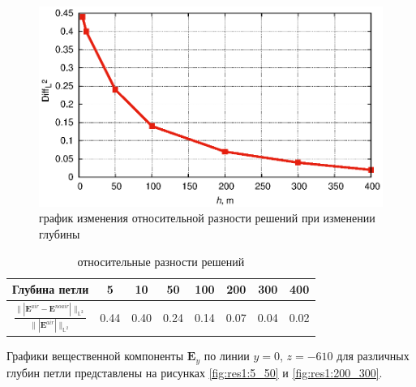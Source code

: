 \documentclass[a4paper,12pt]{article}
\begin{document}
\begin{figure}[H]
	\centering
	\includegraphics[scale=1]{research-1/presentation/presentation.eps}
	\caption{график изменения относительной разности решений при изменении глубины}
	\label{fig:res1:graph}
\end{figure}

\begin{table}[H]
	\caption{относительные разности решений}
	\label{tab:res1:diff}
	\begin{tabularx}{\textwidth}{|C{2.4}|C{0.8}|C{0.8}|C{0.8}|C{0.8}|C{0.8}|C{0.8}|C{0.8}|}
		\hline Глубина петли & 5 & 10 & 50 & 100 & 200 & 300 & 400 \\
		\hline $\displaystyle \frac{\| | \mathbf{E}^{air} - \mathbf{E}^{noair} | \|_{\mathbb{L}^2}}{\| | \mathbf{E}^{air} | \|_{\mathbb{L}^2}}$ & 0.44 & 0.40 & 0.24 & 0.14 & 0.07 & 0.04 & 0.02 \\
		\hline
	\end{tabularx}
\end{table}

Графики вещественной компоненты $\mathbf{E}_y$ по линии $y=0$, $z=-610$ для различных глубин петли представлены на рисунках \ref{fig:res1:5_50} и \ref{fig:res1:200_300}.
\end{document}
